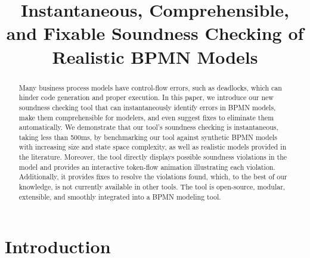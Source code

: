 \documentclass[runningheads]{llncs}
\begin{document}
%
\title{Instantaneous, Comprehensible, and Fixable Soundness Checking of Realistic BPMN Models}
%
%
\maketitle              %
%
\begin{abstract}
Many business process models have control-flow errors, such as deadlocks, which can hinder code generation and proper execution.
In this paper, we introduce our new soundness checking tool that can instantaneously identify errors in BPMN models, make them comprehensible for modelers, and even suggest fixes to eliminate them automatically.
We demonstrate that our tool's soundness checking is instantaneous, taking less than 500ms, by benchmarking our tool against synthetic BPMN models with increasing size and state space complexity, as well as realistic models provided in the literature.
Moreover, the tool directly displays possible soundness violations in the model and provides an interactive token-flow animation illustrating each violation.
Additionally, it provides fixes to resolve the violations found, which, to the best of our knowledge, is not currently available in other tools.
The tool is open-source, modular, extensible, and smoothly integrated into a BPMN modeling tool.

\end{abstract}


\renewcommand{\labelenumi}{(\textbf{\arabic{enumi})}}

\section{Introduction} \label{sec:introduction}
\end{document}
